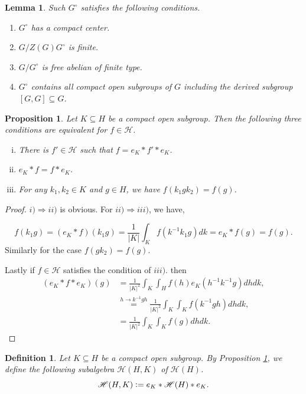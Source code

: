 \documentclass[8pt]{article}
\newtheorem{proposition}{Proposition}[section]
\newtheorem{definition}{Definition}[section]
\newtheorem{lemma}{Lemma}[section]
\newcommand{\defeq}{\vcentcolon=}
\newcommand{\hecke}[0]{\mathscr{H}}
\begin{document}
\begin{lemma}
  \label{lemma_31}
  Such $G^\circ$ satisfies the following conditions.
  \begin{enumerate}[1).]
    \item $G^\circ$ has a compact center.
    \item $G/Z(G)G^\circ$ is finite.
    \item $G/G^\circ$ is free abelian of finite type.
    \item $G^\circ$ contains all compact open subgroups of $G$ including the derived subgroup $[G,G]\subseteq G$.
  \end{enumerate}
\end{lemma}

\begin{proposition}
  Let $K\subseteq H$ be a compact open subgroup. Then the following three conditions are equivalent for $f\in\hecke$.
  \begin{enumerate}[i).]
    \item There is $f'\in\hecke$ such that $f = e_K\ast f' \ast e_K$.
    \item $e_K\ast f = f\ast e_K$.
    \item For any $k_1,k_2\in K$ and $g\in H$, we have $f(k_1gk_2) = f(g)$.
  \end{enumerate}
  \label{proposition_equivalent_def_hecke}
\end{proposition}

\begin{proof}
  $i)\Rightarrow ii)$ is obvious. For $ii)\Rightarrow iii)$, we have,

  \begin{equation*}
    f(k_1g) = (e_K\ast f)(k_1g) = {\frac 1 {\vert K\vert}}\int_K f(k^{-1}k_1g)dk = e_K\ast f(g) = f(g). 
  \end{equation*}
  Similarly for the case $f(gk_2) = f(g)$.
  \par Lastly if $f\in\hecke$ satisfies the condition of $iii)$. then 
  \begin{align*}
    (e_K\ast f\ast e_K)(g) & = {\frac 1 {\vert K\vert^2}}\int_K\int_H f(h)e_K(h^{-1}k^{-1}g)dhdk,\\
    & \stackrel{h\to k^{-1}gh}{=} {\frac 1 {\vert K\vert^2}}\int_K\int_K f(k^{-1}gh)dhdk,\\
    & = {\frac 1 {\vert K\vert^2}}\int_K\int_K f(g)dhdk.
  \end{align*}
\end{proof}

\begin{definition}
  Let $K\subseteq H$ be a compact open subgroup. By Proposition \ref{proposition_equivalent_def_hecke}, we define the following subalgebra $\hecke(H,K)$ of $\hecke(H)$.
  \begin{equation*}
    \hecke(H,K) \defeq e_K\ast \hecke(H)\ast e_K.
  \end{equation*}
\end{definition}
\end{document}
